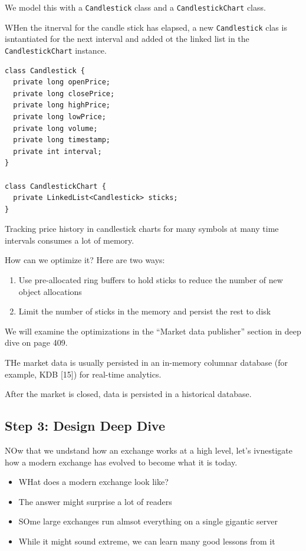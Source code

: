 \documentclass{report}
\theoremstyle{definition}
\let\oldsubsection\subsection
\renewcommand{\subsection}{\oldsubsection*}
\begin{document}
We model this with a \lstinline|Candlestick| class and a \lstinline|CandlestickChart| class.

WHen the itnerval for the candle stick has elapsed, a new \lstinline|Candlestick| clas is isntantiated for the next interval and added ot the linked list in the \lstinline|CandlestickChart| instance.

\begin{lstlisting}
class Candlestick {
  private long openPrice;
  private long closePrice;
  private long highPrice;
  private long lowPrice;
  private long volume;
  private long timestamp;
  private int interval;
}

class CandlestickChart {
  private LinkedList<Candlestick> sticks;
}
\end{lstlisting}

Tracking price history in candlestick charts for many symbols at many time intervals consumes a lot of memory.

How can we optimize it? Here are two ways:

\begin{enumerate}
\item
Use pre-allocated ring buffers to hold sticks to reduce the number of new object allocations
\item
Limit the number of sticks in the memory and persist the rest to disk
\end{enumerate}

We will examine the optimizations in the ``Market data publisher'' section in deep dive on page 409.

THe market data is usually persisted in an in-memory columnar database (for example, KDB [15]) for real-time analytics.

After the market is closed, data is persisted in a historical database.

\subsection{Step 3: Design Deep Dive}

NOw that we undstand how an exchange works at a high level, let's ivnestigate how a modern exchange has evolved to become what it is today.

\begin{itemize}
\item
WHat does a modern exchange look like?
\item
The answer might surprise a lot of readers
\item
SOme large exchanges run almsot everything on a single gigantic server
\item
While it might sound extreme, we can learn many good lessons from it
\end{itemize}
\end{document}
